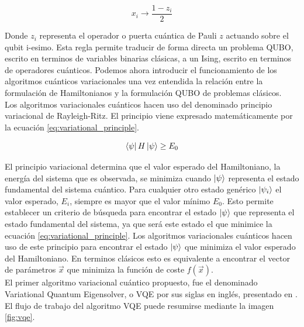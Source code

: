 \begin{equation}
    x_{i} \longrightarrow \frac{1 - z_{i}}{2}
    \label{eq:qubo_ising}
\end{equation}

Donde $z_{i}$ representa el operador o puerta cuántica de Pauli $z$ actuando sobre el qubit i-esimo. Esta regla permite traducir de forma directa un problema QUBO, escrito en terminos de variables binarias clásicas, a un Ising, escrito en terminos de operadores cuánticos. Podemos ahora introducir el funcionamiento de los algoritmos cuánticos variacionales una vez entendida la relación entre la formulación de Hamiltonianos y la formulación  QUBO de problemas clásicos.\\

Los algoritmos variacionales cuánticos hacen uso del denominado principio variacional de Rayleigh-Ritz. El principio viene expresado matemáticamente por la ecuación \ref{eq:variational_principle}.

\begin{equation}
    \bra{\psi} H \ket{\psi} \geq E_{0}
    \label{eq:variational_principle}
\end{equation}

El principio variacional determina que el valor esperado del Hamiltoniano, la energía del sistema que es observada, se minimiza cuando $\ket{\psi}$ representa el estado fundamental del sistema cuántico. Para cualquier otro estado genérico $\ket{\psi_{i}}$ el valor esperado, $E_{i}$, siempre es mayor que el valor mínimo $E_{0}$. Esto permite establecer un criterio de búsqueda para encontrar el estado $\ket{\psi}$ que representa el estado fundamental del sistema, ya que será este estado el que minimice la ecuación \ref{eq:variational_principle}. Los algoritmos variacionales cuánticos hacen uso de este principio para encontrar el estado $\ket{\psi}$ que minimiza el valor esperado del Hamiltoniano. En terminos clásicos esto es equivalente a encontrar el vector de parámetros $\Vec{x}$ que minimiza la función de coste $f(\Vec{x})$. \\

El primer algoritmo variacional cuántico propuesto, fue el denominado  Variational Quantum Eigensolver, o VQE por sus siglas en inglés, presentado en \citep{peruzzo}. El flujo de trabajo del algoritmo VQE puede resumirse mediante la imagen \ref{fig:vqe}.

